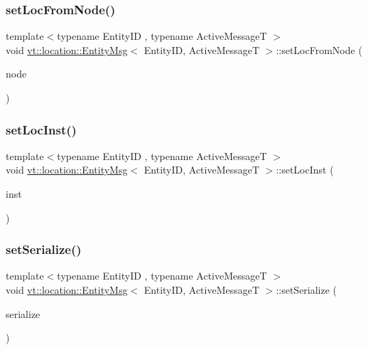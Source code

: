 \subsubsection{\texorpdfstring{set\+Loc\+From\+Node()}{setLocFromNode()}}
{\footnotesize\ttfamily template$<$typename Entity\+ID , typename Active\+MessageT $>$ \\
void \hyperlink{structvt_1_1location_1_1_entity_msg}{vt\+::location\+::\+Entity\+Msg}$<$ Entity\+ID, Active\+MessageT $>$\+::set\+Loc\+From\+Node (\begin{DoxyParamCaption}\item[{\hyperlink{namespacevt_a866da9d0efc19c0a1ce79e9e492f47e2}{Node\+Type} const \&}]{node }\end{DoxyParamCaption})\hspace{0.3cm}{\ttfamily [inline]}}

\mbox{\label{structvt_1_1location_1_1_entity_msg_a7bbd80a3e29d729cd7be84acb167ff90}} 
\subsubsection{\texorpdfstring{set\+Loc\+Inst()}{setLocInst()}}
{\footnotesize\ttfamily template$<$typename Entity\+ID , typename Active\+MessageT $>$ \\
void \hyperlink{structvt_1_1location_1_1_entity_msg}{vt\+::location\+::\+Entity\+Msg}$<$ Entity\+ID, Active\+MessageT $>$\+::set\+Loc\+Inst (\begin{DoxyParamCaption}\item[{\hyperlink{namespacevt_1_1location_a4db6456e8024af2d23fc5ae560fef866}{Loc\+Inst\+Type} const \&}]{inst }\end{DoxyParamCaption})\hspace{0.3cm}{\ttfamily [inline]}}

\mbox{\label{structvt_1_1location_1_1_entity_msg_ae44ee6e75fa015eb0c92ca0b5c595fa8}} 
\subsubsection{\texorpdfstring{set\+Serialize()}{setSerialize()}}
{\footnotesize\ttfamily template$<$typename Entity\+ID , typename Active\+MessageT $>$ \\
void \hyperlink{structvt_1_1location_1_1_entity_msg}{vt\+::location\+::\+Entity\+Msg}$<$ Entity\+ID, Active\+MessageT $>$\+::set\+Serialize (\begin{DoxyParamCaption}\item[{bool const}]{serialize }\end{DoxyParamCaption})\hspace{0.3cm}{\ttfamily [inline]}}



